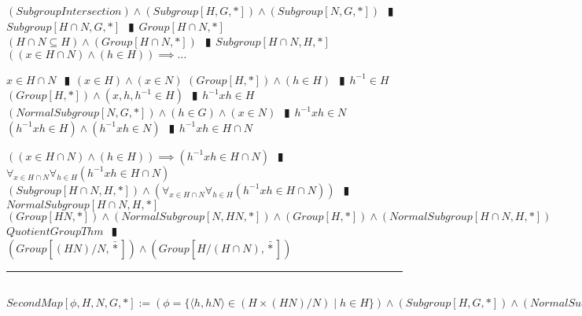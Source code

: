 \documentclass{book}
\newcommand{\abr}{:=}
\newcommand{\pipe}{$\phantom{(}\vrectangleblack\phantom{)}$}
\newcommand{\pr}[1]{\left(#1\right)}
\newcommand{\bbin}[1]{\mathbin{{\bar{#1}}}}
\newcommand{\st}{\mathbin{|}}
\begin{document}
\begin{enumerate}
  \lit $(SubgroupIntersection) \land (Subgroup[H, G, *]) \land (Subgroup[N, G, *])$ \pipe $Subgroup[H \cap N, G, *]$ \pipe $Group[H \cap N, *]$
  \lit $(H \cap N \subseteq H) \land (Group[H \cap N, *])$ \pipe $Subgroup[H \cap N, H, *]$
  \lit $\pr{(x \in H \cap N) \land (h \in H)} \implies \ldots$
  \begin{enumerate}
    \lit $x \in H \cap N$ \pipe $(x \in H) \land (x \in N)$
    \lit $(Group[H, *]) \land (h \in H)$ \pipe $h^{-1} \in H$
    \lit $(Group[H, *]) \land (x, h, h^{-1} \in H)$ \pipe $h^{-1} x h \in H$
    \lit $(NormalSubgroup[N, G, *]) \land (h \in G) \land (x \in N)$ \pipe $h^{-1} x h \in N$
    \lit $(h^{-1} x h \in H) \land (h^{-1} x h \in N)$ \pipe $h^{-1} x h \in H \cap N$
  \end{enumerate}
  \lit $\pr{(x \in H \cap N) \land (h \in H)} \implies (h^{-1} x h \in H \cap N)$ \pipe $\forall_{x \in H \cap N} \forall_{h \in H}(h^{-1} x h \in H \cap N)$
  \lit $(Subgroup[H \cap N, H, *]) \land \pr{\forall_{x \in H \cap N} \forall_{h \in H}(h^{-1} x h \in H \cap N)}$ \pipe $NormalSubgroup[H \cap N, H, *]$
  \lit $(Group[H N, *]) \land (NormalSubgroup[N, H N, *]) \land (Group[H, *]) \land (NormalSubgroup[H \cap N, H, *])$
  \lit $QuotientGroupThm$ \pipe $\pr{Group[(H N) / N, \bbin{*}]} \land \pr{Group[H / (H \cap N), \bbin{*}]}$
\end{enumerate} \vspace{.75mm} \hrule \vspace{.75mm} \ \\ 

$SecondMap[\phi, H, N, G, *] \abr \pr{\phi = \{\langle h, h N \rangle \in \pr{H \times (H N) / N} \st h \in H\}} \land (Subgroup[H, G, *]) \land (NormalSubgroup[N, G, *])$ \\
\end{document}
